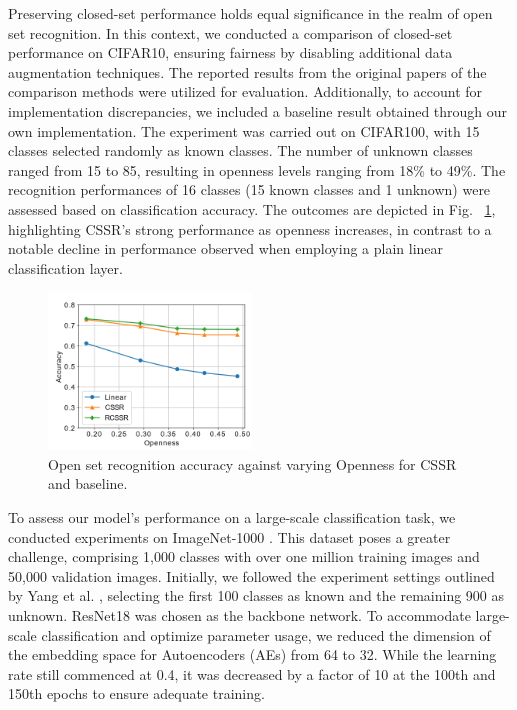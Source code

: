 \documentclass{gji}
\begin{document}
Preserving closed-set performance holds equal significance in the realm of open set recognition. In this context, we conducted a comparison of closed-set performance on CIFAR10, ensuring fairness by disabling additional data augmentation techniques. The reported results from the original papers of the comparison methods were utilized for evaluation. Additionally, to account for implementation discrepancies, we included a baseline result obtained through our own implementation.
The experiment was carried out on CIFAR100, with 15 classes selected randomly as known classes. The number of unknown classes ranged from 15 to 85, resulting in openness levels ranging from 18\% to 49\%. The recognition performances of 16 classes (15 known classes and 1 unknown) were assessed based on classification accuracy. The outcomes are depicted in Fig. ~\ref{fig8}, highlighting CSSR's strong performance as openness increases, in contrast to a notable decline in performance observed when employing a plain linear classification layer.
\begin{figure}  
\centering
  \includegraphics[width=0.48\textwidth]{fig8.png}
     \caption{Open set recognition accuracy against varying Openness for CSSR and baseline.} \label{fig8}
    
  \end{figure}
To assess our model's performance on a large-scale classification task, we conducted experiments on ImageNet-1000 \cite{10}. This dataset poses a greater challenge, comprising 1,000 classes with over one million training images and 50,000 validation images. Initially, we followed the experiment settings outlined by Yang et al. \cite{42}, selecting the first 100 classes as known and the remaining 900 as unknown. ResNet18 was chosen as the backbone network. To accommodate large-scale classification and optimize parameter usage, we reduced the dimension of the embedding space for Autoencoders (AEs) from 64 to 32. While the learning rate still commenced at 0.4, it was decreased by a factor of 10 at the 100th and 150th epochs to ensure adequate training.
\end{document}

